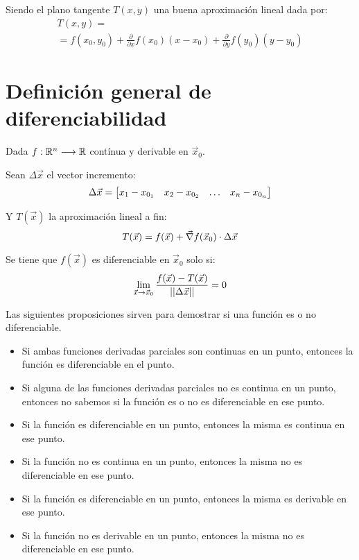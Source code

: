 \documentclass[a5paper,12pt,twoside]{book}
\begin{document}
Siendo el plano tangente $T(x,y)$ una buena aproximación lineal dada por:
\begin{multline*}
    T(x,y) =
    \\
    = f(x_0,y_0) + \frac{\partial}{\partial x} f(x_0) \left(x-x_0\right) + \frac{\partial}{\partial y} f(y_0) \left(y-y_0\right)
\end{multline*}


\section{Definición general de diferenciabilidad}

Dada $f:\mathbb{R}^n \longrightarrow \mathbb{R}$ contínua y derivable en $\Vec{x}_0$.

Sean $\Delta \Vec{x}$ el vector incremento:
\begin{equation*}
    \Delta \Vec{x} = \begin{bmatrix} x_1-x_{0_1} & x_2-x_{0_2} & \dots & x_n-x_{0_n} \end{bmatrix}
\end{equation*}

Y $T(\Vec{x})$ la aproximación lineal a fin:
\begin{equation*}
    T(\Vec{x}) = f(\Vec{x}) + \Vec{\nabla} f(\Vec{x}_0) \cdot \Delta \Vec{x}
\end{equation*}

Se tiene que $f(\Vec{x})$ es diferenciable en $\Vec{x}_0$ solo si:
\begin{equation*}
    \lim_{\Vec{x} \to \Vec{x}_0} \frac{f(\Vec{x})-T(\Vec{x})}{{\left|\left| {\Delta \Vec{x}} \right|\right|}} = 0
\end{equation*}

Las siguientes proposiciones sirven para demostrar si una función es o no diferenciable.

\begin{itemize}
    \item Si ambas funciones derivadas parciales son continuas en un punto, entonces la función es diferenciable en el punto.
    \item Si alguna de las funciones derivadas parciales no es continua en un punto, entonces no sabemos si la función es o no es diferenciable en ese punto.
    \item Si la función es diferenciable en un punto, entonces la misma es continua en ese punto.
    \item Si la función no es continua en un punto, entonces la misma no es diferenciable en ese punto.
    \item Si la función es diferenciable en un punto, entonces la misma es derivable en ese punto.
    \item Si la función no es derivable en un punto, entonces la misma no es diferenciable en ese punto.
\end{itemize}
\end{document}
